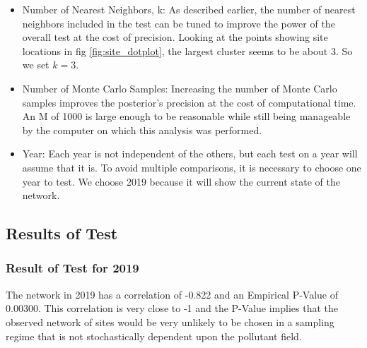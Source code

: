 \documentclass{article}
\begin{document}
\begin{itemize}
    \item Number of Nearest Neighbors, \gls{k}:
As described earlier, the number of nearest neighbors included in the test can be tuned to improve the power of the overall test at the cost of precision.  Looking at the points showing site locations in fig \ref{fig:site_dotplot}, the largest cluster seems to be about 3.  So we set $k = 3$.  

\item Number of Monte Carlo Samples:
Increasing the number of Monte Carlo samples improves the posterior's precision at the cost of computational time.  An M of 1000 is large enough to be reasonable while still being manageable by the  computer on which this analysis was performed.
\item Year:
Each year is not independent of the others, but each test on a year will assume that it is.  To avoid multiple comparisons, it is necessary to choose one year to test.  We choose 2019 because it will show the current state of the network.

\end{itemize}


\subsection{Results of Test}
\label{subsec:testresults}

\subsubsection*{Result of Test for 2019}
\label{subsubsec:test2019}


The network in 2019 has a correlation of -0.822 and an Empirical P-Value of 0.00300. 
This correlation is very close to -1 and the P-Value implies that the observed network of sites would be very unlikely to be chosen in a sampling regime that is not stochastically dependent upon the pollutant field.  
\end{document}
